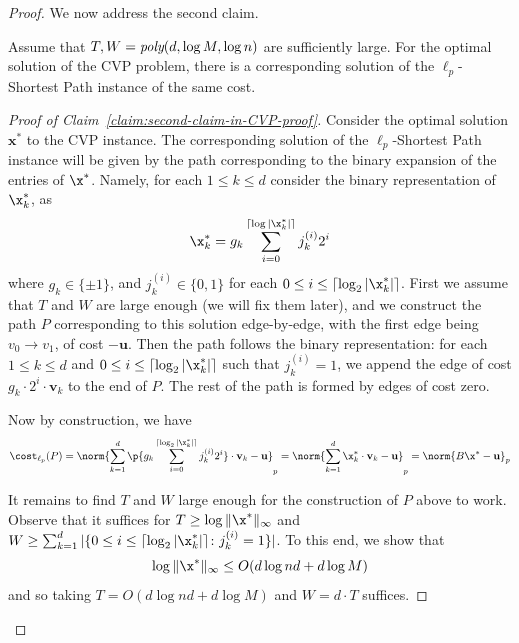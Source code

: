 \documentclass[11pt,a4paper]{article}
\begin{document}
\begin{proof}
        We now address the second claim.
        \begin{claim}\label{claim:second-claim-in-CVP-proof}
            Assume that $T, W =\emph{\text{poly}}(d,\log M, \log n)$ are sufficiently large. For the optimal solution of the CVP problem, there is a corresponding solution of the $\ell_p$-Shortest Path instance of the same cost.
        \end{claim}
        \begin{proof}[Proof of Claim~\ref{claim:second-claim-in-CVP-proof}]
            Consider the optimal solution $\mathbf{x}^*$ to the CVP instance. 
            The corresponding solution of the \(\ell_p\)-Shortest Path instance will be given by
            the path corresponding to the binary expansion of the entries of \(\x^*\). Namely,
            for each \(1 \le k \le d\) consider the binary representation of \(\x^*_k\), as
            \[\x^*_k = g_k \sum_{i=0}^{\lceil \log |\x^*_k| \rceil} j_k^{(i)} 2^{i}\]
            where \(g_k \in \{\pm 1\}\), and \(j_k^{(i)} \in \{0, 1\}\) for each \(0 \le i \le \lceil \log_2 |\x^*_k| \rceil\).
            First we assume that \(T\) and \(W\) are large enough (we will fix them later), and we construct the path \(P\) corresponding to this solution edge-by-edge,
            with the first edge being \(v_0 \to v_1\), of cost \(-\mathbf{u}\).
            Then the path follows the binary representation:
            for each \(1 \le k \le d\)
            and \(0 \le i \le \lceil \log_2 |\x_k^*| \rceil\) such that \(j_k^{(i)} = 1\),
            we append the edge of cost \(g_k \cdot 2^{i} \cdot \mathbf{v}_k\) to the end of \(P\). The rest of the path is formed by edges of cost zero.
            
            Now by construction, we have
            \[\cost_{\ell_p}(P) = \norm{\sum_{k = 1}^d \p{g_k \sum_{i=0}^{\lceil \log_2 |\x_k^*| \rceil} j_k^{(i)} 2^{i}} \cdot \mathbf{v}_k - \mathbf{u}}_p = \norm{\sum_{k=1}^d \x^*_k \cdot \mathbf{v}_k - \mathbf{u}}_p = \norm{B \x^* - \mathbf{u}}_p\]

            It remains to find \(T\) and \(W\) large enough for the construction of \(P\) above to work.
            Observe that it suffices for \(T \ge \log \|\x^*\|_\infty \)
            and \(W \ge \sum_{k=1}^d |\{0 \le i \le \lceil \log_2 |\x_k^*| \rceil \colon j_k^{(i)} = 1\}|\).
            To this end, we show that
            \[\log \|\x^*\|_\infty \le O(d \log nd + d \log M)\]
            and so taking \(T = O(d \log nd + d \log M)\)
            and \(W = d \cdot T\) suffices.
            

\end{proof}
\end{proof}
\end{document}
